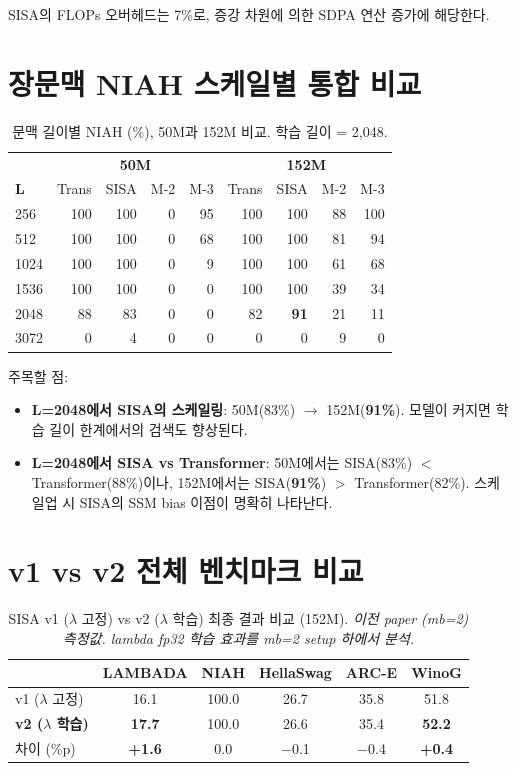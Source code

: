 \documentclass[11pt]{article}
\begin{document}
SISA의 FLOPs 오버헤드는 7\%로, 증강 차원에 의한 SDPA 연산 증가에 해당한다.

\section{장문맥 NIAH 스케일별 통합 비교}

\begin{table}[h]
\centering\small
\caption{문맥 길이별 NIAH (\%), 50M과 152M 비교. 학습 길이 = 2,048.}
\begin{tabular}{l|rrrr|rrrr}
\toprule
& \multicolumn{4}{c|}{\textbf{50M}} & \multicolumn{4}{c}{\textbf{152M}} \\
\textbf{L} & Trans & SISA & M-2 & M-3 & Trans & SISA & M-2 & M-3 \\
\midrule
256 & 100 & 100 & 0 & 95 & 100 & 100 & 88 & 100 \\
512 & 100 & 100 & 0 & 68 & 100 & 100 & 81 & 94 \\
1024 & 100 & 100 & 0 & 9 & 100 & 100 & 61 & 68 \\
1536 & 100 & 100 & 0 & 0 & 100 & 100 & 39 & 34 \\
2048 & 88 & 83 & 0 & 0 & 82 & \textbf{91} & 21 & 11 \\
3072 & 0 & 4 & 0 & 0 & 0 & 0 & 9 & 0 \\
\bottomrule
\end{tabular}
\end{table}

주목할 점:
\begin{itemize}[leftmargin=*]
\item \textbf{L=2048에서 SISA의 스케일링}: 50M(83\%) $\to$ 152M(\textbf{91\%}). 모델이 커지면 학습 길이 한계에서의 검색도 향상된다.
\item \textbf{L=2048에서 SISA vs Transformer}: 50M에서는 SISA(83\%) $<$ Transformer(88\%)이나, 152M에서는 SISA(\textbf{91\%}) $>$ Transformer(82\%). 스케일업 시 SISA의 SSM bias 이점이 명확히 나타난다.
\end{itemize}

\section{v1 vs v2 전체 벤치마크 비교}

\begin{table}[h]
\centering\small
\caption{SISA v1 ($\lambda$ 고정) vs v2 ($\lambda$ 학습) 최종 결과 비교 (152M). \textit{이전 paper (mb=2) 측정값. lambda fp32 학습 효과를 mb=2 setup 하에서 분석.}}
\label{tab:v1v2_appendix}
\begin{tabular}{lccccc}
\toprule
& \textbf{LAMBADA} & \textbf{NIAH} & \textbf{HellaSwag} & \textbf{ARC-E} & \textbf{WinoG} \\
\midrule
v1 ($\lambda$ 고정) & 16.1 & 100.0 & 26.7 & 35.8 & 51.8 \\
\textbf{v2 ($\lambda$ 학습)} & \textbf{17.7} & 100.0 & 26.6 & 35.4 & \textbf{52.2} \\
\midrule
차이 (\%p) & \textbf{+1.6} & 0.0 & $-$0.1 & $-$0.4 & \textbf{+0.4} \\
\bottomrule
\end{tabular}
\end{table}
\end{document}

